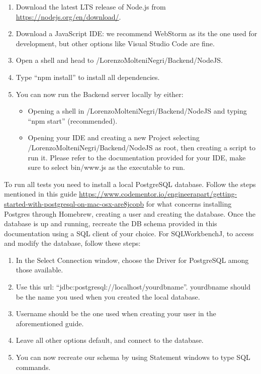 \documentclass[titlepage]{article}
\begin{document}
	\begin{enumerate}
		\item Download the latest LTS release of Node.js from \href{https://nodejs.org/en/download/}{https://nodejs.org/en/download/}.
		\item Download a JavaScript IDE: we recommend WebStorm as it\textsc{}s the one used for development, but other options like Visual Studio Code are fine.
		\item Open a shell and head to /LorenzoMolteniNegri/Backend/NodeJS.
		\item Type “npm install” to install all dependencies. 
		\item You can now run the Backend server locally by either:
		\begin{itemize}
			\item Opening a shell in /LorenzoMolteniNegri/Backend/NodeJS and typing “npm start” (recommended).
			\item Opening your IDE and creating a new Project selecting /LorenzoMolteniNegri/Backend/NodeJS as root, then creating a script to run it. Please refer to the documentation provided for your IDE, make sure to select bin/www.js as the executable to run.
		\end{itemize}
	\end{enumerate}
	To run all tests you need to install a local PostgreSQL database. 
	Follow the steps mentioned in this guide \href{https://www.codementor.io/engineerapart/getting-started-with-postgresql-on-mac-osx-are8jcopb}{https://www.codementor.io/engineerapart/getting-started-with-postgresql-on-mac-osx-are8jcopb} for what concerns installing Postgres through Homebrew, creating a user and creating the database.
	Once the database is up and running, recreate the DB schema provided in this documentation using a SQL client of your choice. For SQLWorkbenchJ, to access and modify the database, follow these steps:
	\begin{enumerate}
		\item In the Select Connection window, choose the Driver for PostgreSQL among those available.
		\item Use this url: “jdbc:postgresql://localhost/yourdbname”. yourdbname should be the name you used when you created the local database.
		\item Username should be the one used when creating your user in the aforementioned guide.
		\item Leave all other options default, and connect to the database.
		\item You can now recreate our schema by using Statement windows to type SQL commands.
	\end{enumerate}
	
\end{document}
